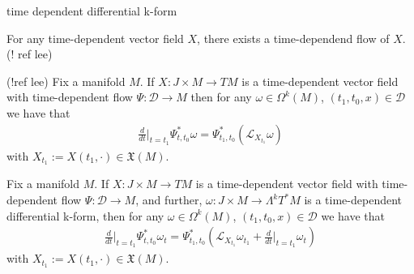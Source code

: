 \begin{definition}
time dependent differential k-form
\end{definition}

\begin{theorem} \label{flowthm}
For any time-dependent vector field $X$, there exists a time-dependend flow of $X$. (! ref lee)
\end{theorem}

\begin{proposition}
(!ref lee)
Fix a manifold $M$. If $X : J \times M \to TM$ is a time-dependent vector field with time-dependent flow $\Psi: \mathcal{D} \to M$ then for any $\omega \in \Omega^k(M)$, $(t_1,t_0,x) \in \mathcal{D}$ we have that
\begin{align*}
\frac{d}{dt} \bigg\vert_{t=t_1} \Psi^*_{t,t_0} \omega = \Psi^*_{t_1,t_0} \left( \mathcal{L}_{X_{t_1}} \omega \right)
\end{align*}
with $X_{t_1} := X(t_1, \cdot) \in \mathfrak{X}(M)$.
\end{proposition}

\begin{proposition}
Fix a manifold $M$. If $X : J \times M \to TM$ is a time-dependent vector field with time-dependent flow $\Psi: \mathcal{D} \to M$, and further, $\omega : J \times M \to \Lambda^k T^* M$ is a time-dependent differential k-form, then for any $\omega \in \Omega^k(M)$, $(t_1,t_0,x) \in \mathcal{D}$ we have that
\begin{align*}
\frac{d}{dt} \bigg\vert_{t=t_1} \Psi^*_{t,t_0} \omega_t = \Psi^*_{t_1,t_0} \left( \mathcal{L}_{X_{t_1}} \omega_{t_1} + \frac{d}{dt} \bigg\vert_{t=t_1} \omega_t \right)
\end{align*}
with $X_{t_1} := X(t_1, \cdot) \in \mathfrak{X}(M)$.
\end{proposition}

